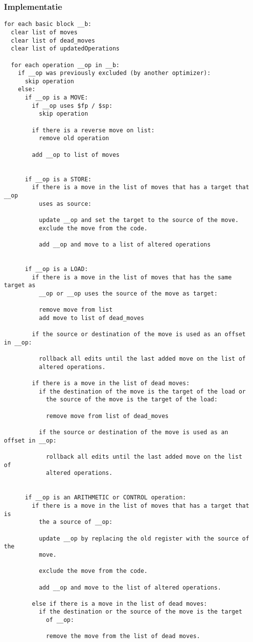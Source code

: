 \documentclass[a4paper,10pt]{article}
\begin{document}
\subsubsection{Implementatie}

\begin{verbatim}
for each basic block __b:
  clear list of moves
  clear list of dead_moves
  clear list of updatedOperations

  for each operation __op in __b:
    if __op was previously excluded (by another optimizer):
      skip operation
    else:
      if __op is a MOVE:
        if __op uses $fp / $sp:
          skip operation

        if there is a reverse move on list:
          remove old operation

        add __op to list of moves


      if __op is a STORE:
        if there is a move in the list of moves that has a target that __op
          uses as source:

          update __op and set the target to the source of the move.
          exclude the move from the code.

          add __op and move to a list of altered operations


      if __op is a LOAD:
        if there is a move in the list of moves that has the same target as
          __op or __op uses the source of the move as target:

          remove move from list
          add move to list of dead_moves

        if the source or destination of the move is used as an offset in __op:

          rollback all edits until the last added move on the list of
          altered operations.

        if there is a move in the list of dead moves:
          if the destination of the move is the target of the load or
            the source of the move is the target of the load:

            remove move from list of dead_moves

          if the source or destination of the move is used as an offset in __op:

            rollback all edits until the last added move on the list of
            altered operations.

      
      if __op is an ARITHMETIC or CONTROL operation:
        if there is a move in the list of moves that has a target that is
          the a source of __op:

          update __op by replacing the old register with the source of the
          move.

          exclude the move from the code.

          add __op and move to the list of altered operations.

        else if there is a move in the list of dead moves:
          if the destination or the source of the move is the target
            of __op:

            remove the move from the list of dead moves.
\end{verbatim}
\end{document}
